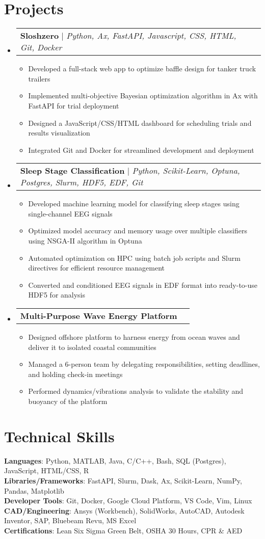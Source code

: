\documentclass[letterpaper,11pt]{article}
\makeatletter
\newcommand{\resumeItem}[1]{
  \item\small{
    {#1 \vspace{-2pt}}
  }
}
\newcommand{\resumeProjectHeading}[1]{
    \item
    \begin{tabular*}{0.97\textwidth}{l@{\extracolsep{\fill}}r}
      \small#1 \\
    \end{tabular*}\vspace{-7pt}
}
\newcommand{\resumeSubHeadingListStart}{\begin{itemize}[leftmargin=0.15in, label={}]}
\newcommand{\resumeSubHeadingListEnd}{\end{itemize}}
\newcommand{\resumeItemListStart}{\begin{itemize}}
\newcommand{\resumeItemListEnd}{\end{itemize}\vspace{-5pt}}
\makeatother
\begin{document}
\section{Projects}
    \resumeSubHeadingListStart
      \resumeProjectHeading
          {\textbf{Sloshzero} $|$ \emph{Python, Ax, FastAPI, Javascript, CSS, HTML, Git, Docker}}
          \resumeItemListStart
            \resumeItem{Developed a full-stack web app to optimize baffle design for tanker truck trailers}
            \resumeItem{Implemented multi-objective Bayesian optimization algorithm in Ax with FastAPI for trial deployment}
            \resumeItem{Designed a JavaScript/CSS/HTML dashboard for scheduling trials and results visualization}
            \resumeItem{Integrated Git and Docker for streamlined development and deployment}
          \resumeItemListEnd
      \resumeProjectHeading
          {\textbf{Sleep Stage Classification} $|$ \emph{Python, Scikit-Learn, Optuna, Postgres, Slurm, HDF5, EDF, Git}}
          \resumeItemListStart
            \resumeItem{Developed machine learning model for classifying sleep stages using single-channel EEG signals}
            \resumeItem{Optimized model accuracy and memory usage over multiple classifiers using NSGA-II algorithm in Optuna}
            \resumeItem{Automated optimization on HPC using batch job scripts and Slurm directives for efficient resource management}
            \resumeItem{Converted and conditioned EEG signals in EDF format into ready-to-use HDF5 for analysis}
          \resumeItemListEnd
      \resumeProjectHeading
          {\textbf{Multi-Purpose Wave Energy Platform}}
          \resumeItemListStart
            \resumeItem{Designed offshore platform to harness energy from ocean waves and deliver it to isolated coastal communities}
            \resumeItem{Managed a 6-person team by delegating responsibilities, setting deadlines, and holding check-in meetings}
            \resumeItem{Performed dynamics/vibrations analysis to validate the stability and buoyancy of the platform}
          \resumeItemListEnd
    \resumeSubHeadingListEnd



%
\section{Technical Skills}
 \begin{itemize}[leftmargin=0.15in, label={}]
    \small{\item{
     \textbf{Languages}{: Python, MATLAB, Java, C/C++, Bash, SQL (Postgres), JavaScript, HTML/CSS, R} \\
     \textbf{Libraries/Frameworks}{: FastAPI, Slurm, Dask, Ax, Scikit-Learn, NumPy, Pandas, Matplotlib} \\
     \textbf{Developer Tools}{: Git, Docker, Google Cloud Platform, VS Code, Vim, Linux} \\
     \textbf{CAD/Engineering}{: Ansys (Workbench), SolidWorks, AutoCAD, Autodesk Inventor, SAP, Bluebeam Revu, MS Excel} \\ %
     \textbf{Certifications}{: Lean Six Sigma Green Belt, OSHA 30 Hours, CPR \& AED} \\
    }}
 \end{itemize}


\end{document}

